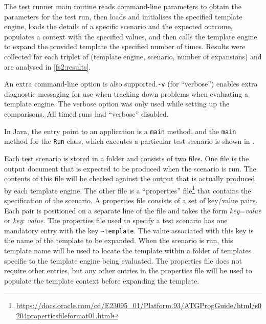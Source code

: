 The test runner main routine reads command-line parameters to obtain the parameters for the test run, then loads and initialises the specified \gls{template engine}, loads the details of a specific scenario and the expected outcome, populates a context with the specified values, and then calls the \gls{template engine} to expand the provided template the specified number of times. Results were collected for each triplet of (\gls{template engine}, scenario, number of expansions) and are analysed in \autoref{fs2:results}.

An extra command-line option is also supported.\verb!-v! (for \enquote{verbose}) enables extra diagnostic messaging for use when tracking down problems when evaluating a \gls{template engine}. The verbose option was only used while setting up the comparisons. All timed runs had \enquote{verbose} disabled.

In Java, the entry point to an application is a \verb!main! method, and the \verb!main! method for the \verb!Run! class, which executes a particular test scenario is shown in .

Each test scenario is stored in a folder and consists of two files. One file is the output document that is expected to be produced when the scenario is run. The contents of this file will be checked against the output that is actually produced by each \gls{template engine}. The other file is a \enquote{properties} file\footnote{\url{https://docs.oracle.com/cd/E23095_01/Platform.93/ATGProgGuide/html/s0204propertiesfileformat01.html}} that contains the specification of the scenario. A properties file consists of a set of key/value pairs. Each pair is positioned on a separate line of the file and takes the form \emph{key}=\emph{value} or \emph{key}: \emph{value}. The properties file used to specify a test scenario has one mandatory entry with the key \verb!~template!. The value associated with this key is the name of the template to be expanded. When the scenario is run, this template name will be used to locate the template within a folder of templates specific to the \gls{template engine} being evaluated. The properties file does not require other entries, but any other entries in the properties file will be used to populate the template context before expanding the template.

